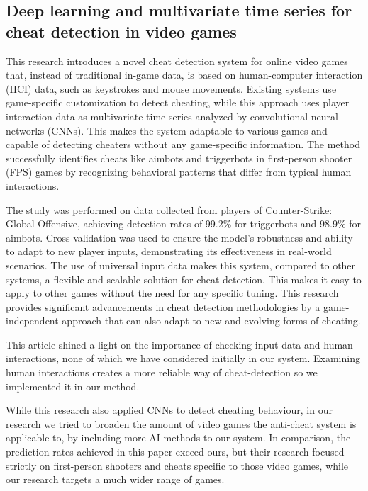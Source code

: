 \subsection{Deep learning and multivariate time series for cheat detection in video games \cite{pinto2021deep}}

This research introduces a novel cheat detection system for online video games that, instead of traditional in-game data, is based on human-computer interaction (HCI) data, such as keystrokes and mouse movements. Existing systems use game-specific customization to detect cheating, while this approach uses player interaction data as multivariate time series analyzed by convolutional neural networks (CNNs). This makes the system adaptable to various games and capable of detecting cheaters without any game-specific information. The method successfully identifies cheats like aimbots and triggerbots in first-person shooter (FPS) games by recognizing behavioral patterns that differ from typical human interactions.

The study was performed on data collected from players of Counter-Strike: Global Offensive, achieving detection rates of 99.2\% for triggerbots and 98.9\% for aimbots. Cross-validation was used to ensure the model’s robustness and ability to adapt to new player inputs, demonstrating its effectiveness in real-world scenarios. The use of universal input data makes this system, compared to other systems, a flexible and scalable solution for cheat detection. This makes it easy to apply to other games without the need for any specific tuning. This research provides significant advancements in cheat detection methodologies by a game-independent approach that can also adapt to new and evolving forms of cheating.

This article shined a light on the importance of checking input data and human interactions, none of which we have considered initially in our system. Examining human interactions creates a more reliable way of cheat-detection so we implemented it in our method.

While this research also applied CNNs to detect cheating behaviour, in our research we tried to broaden the amount of video games the anti-cheat system is applicable to, by including more AI methods to our system. In comparison, the prediction rates achieved in this paper exceed ours, but their research focused strictly on first-person shooters and cheats specific to those video games, while our research targets a much wider range of games.

